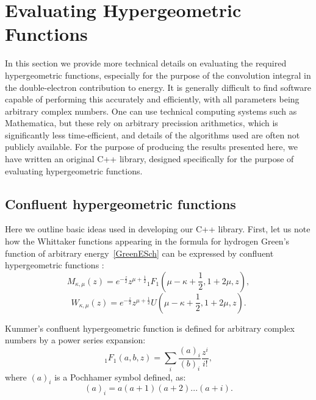 \chapter{Evaluating Hypergeometric Functions}


	In this section we provide more technical details on evaluating the required hypergeometric functions, especially for the purpose of the convolution integral in the double-electron contribution to energy. It is generally difficult to find software capable of performing this accurately and efficiently, with all parameters being arbitrary complex numbers. One can use technical computing systems such as Mathematica, but these rely on arbitrary precission arithmetics, which is significantly less time-efficient, and details of the algorithms used are often not publicly available. For the purpose of producing the results presented here, we have written an original C++ library, designed specifically for the purpose of evaluating hypergeometric functions.
	
	\section{Confluent hypergeometric functions}
	
	Here we outline basic ideas used in developing our C++ library. First, let us note how the Whittaker functions appearing in the formula for hydrogen Green's function of arbitrary energy~\eqref{GreenESch} can be expressed by confluent hypergeometric functions \cite{AS}:
	\begin{equation}
M_{\kappa,\mu}(z) = e^{-\frac{z}{2}}z^{\mu + \frac{1}{2}}{_1F_1}(\mu-\kappa+\frac{1}{2},1+2\mu,z) ,
	\end{equation}
	\begin{equation}
	W_{\kappa,\mu}(z) = e^{-\frac{z}{2}}z^{\mu + \frac{1}{2}}U(\mu-\kappa+\frac{1}{2},1+2\mu,z) .
	\end{equation}

	Kummer's confluent hypergeometric function is defined for arbitrary complex numbers by a power series expansion:
		\begin{equation} \label{1F1}
		_1F_1(a,b,z) = \sum_i \frac{(a)_i}{(b)_i} \frac{z^i}{i!} ,
		\end{equation}
where $(a)_i$ is a Pochhamer symbol defined, as:
\begin{equation}
(a)_i = a(a+1)(a+2)...(a+i) .
\end{equation}

